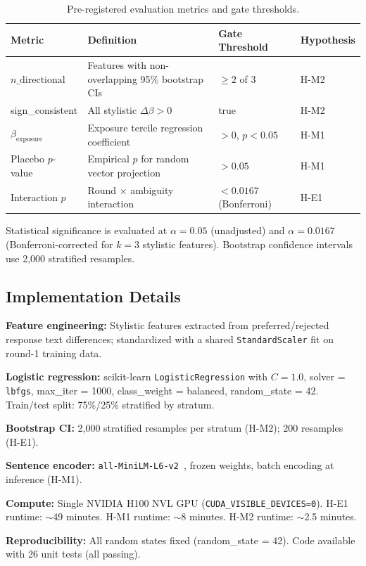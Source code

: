 \begin{table}[h]
\centering
\caption{Pre-registered evaluation metrics and gate thresholds.}
\begin{tabular}{llll}
\toprule
Metric & Definition & Gate Threshold & Hypothesis \\
\midrule
$n\_\text{directional}$ & Features with non-overlapping 95\% bootstrap CIs & $\geq 2$ of 3 & H-M2 \\
sign\_consistent & All stylistic $\Delta\beta > 0$ & true & H-M2 \\
$\beta_\text{exposure}$ & Exposure tercile regression coefficient & $> 0$, $p < 0.05$ & H-M1 \\
Placebo $p$-value & Empirical $p$ for random vector projection & $> 0.05$ & H-M1 \\
Interaction $p$ & Round $\times$ ambiguity interaction & $< 0.0167$ (Bonferroni) & H-E1 \\
\bottomrule
\end{tabular}
\end{table}

Statistical significance is evaluated at $\alpha = 0.05$ (unadjusted) and $\alpha = 0.0167$ (Bonferroni-corrected for $k = 3$ stylistic features). Bootstrap confidence intervals use 2,000 stratified resamples.

\subsection{Implementation Details}

\textbf{Feature engineering:} Stylistic features extracted from preferred/rejected response text differences; standardized with a shared \texttt{StandardScaler} fit on round-1 training data.

\textbf{Logistic regression:} scikit-learn \texttt{LogisticRegression} with $C = 1.0$, solver = \texttt{lbfgs}, max\_iter = 1000, class\_weight = balanced, random\_state = 42. Train/test split: 75\%/25\% stratified by stratum.

\textbf{Bootstrap CI:} 2,000 stratified resamples per stratum (H-M2); 200 resamples (H-E1).

\textbf{Sentence encoder:} \texttt{all-MiniLM-L6-v2}~\citep{Reimers2019SentenceBERT}, frozen weights, batch encoding at inference (H-M1).

\textbf{Compute:} Single NVIDIA H100 NVL GPU (\texttt{CUDA\_VISIBLE\_DEVICES=0}). H-E1 runtime: $\sim$49 minutes. H-M1 runtime: $\sim$8 minutes. H-M2 runtime: $\sim$2.5 minutes.

\textbf{Reproducibility:} All random states fixed (random\_state = 42). Code available with 26 unit tests (all passing).
